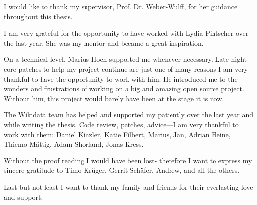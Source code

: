 I would like to thank my supervisor, Prof. Dr. Weber-Wulff, for her guidance throughout this thesis.

I am very grateful for the opportunity to have worked with Lydia Pintscher over the last year. She was my mentor and became a great inspiration. 

On a technical level, Marius Hoch supported me whenever necessary. Late night core patches to help my project continue are just one of many reasons I am very thankful to have the opportunity to work with him. He introduced me to the wonders and frustrations of working on a big and amazing open source project. Without him, this project would barely have been at the stage it is now.

The Wikidata team has helped and supported my patiently over the last year and while writing the thesis. Code review, patches, advice---I am very thankful to work with them: Daniel Kinzler, Katie Filbert, Marius, Jan, Adrian Heine, Thiemo Mättig, Adam Shorland, Jonas Kress.  

Without the proof reading I would have been lost- therefore I want to express my sincere gratitude to Timo Krüger, Gerrit Schäfer, Andrew, and all the others. 

Last but not least I want to thank my family and friends for their everlasting love and support.